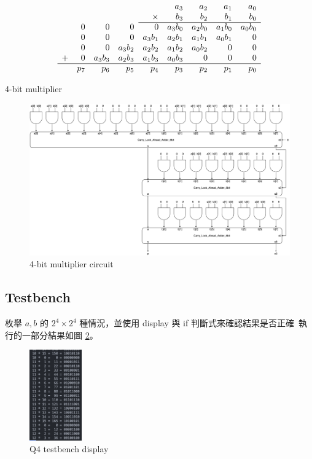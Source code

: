 \documentclass[10.5pt,compsoc,UTF8]{CjC}
\theoremstyle{mystyle}
\begin{document}
\begin{table}[htp]
  \centering
  \[
    \begin{array}{r r r r r r r r r r}
      & & & & & a_3 & a_2 & a_1 & a_0 \\
      & & & & \times & b_3 & b_2 & b_1 & b_0 \\
      \cline{5-9}
      & 0 & 0 & 0 & 0 & a_3b_0 & a_2b_0 & a_1b_0 & a_0b_0 \\
      & 0 & 0 & 0 & a_3b_1 & a_2b_1 & a_1b_1 & a_0b_1 & 0 \\
      & 0 & 0 & a_3b_2 & a_2b_2 & a_1b_2 & a_0b_2 & 0 & 0 \\
      + & 0 & a_3b_3 & a_2b_3 & a_1b_3 & a_0b_3 & 0 & 0 & 0 \\
      \cline{1-9}
      & p_7 & p_6 & p_5 & p_4 & p_3 & p_2 & p_1 & p_0 \\
    \end{array}
    \]
  \caption{4-bit multiplier}
  \label{tab:polynomial-multiplication}
  \end{table}
  \begin{figure}[h]
    \centering
    \includegraphics[width=\textwidth]{Q4-circuit.png}
    \caption{4-bit multiplier circuit}
    \label{fig:Q4_circuit}
  \end{figure}


\newpage

\subsection{Testbench}


枚舉 $a, b$ 的 $2^4 \times 2^4$ 種情況，並使用 display 與 if 判斷式來確認結果是否正確\
執行的一部分結果如圖 \ref{fig:Q4_display}。

\begin{figure}[htp]
  \centering
  \includegraphics[width=0.2\textwidth]{Q4-display.png}
  \caption{Q4 testbench display}
  \label{fig:Q4_display}
\end{figure}
\end{document}
